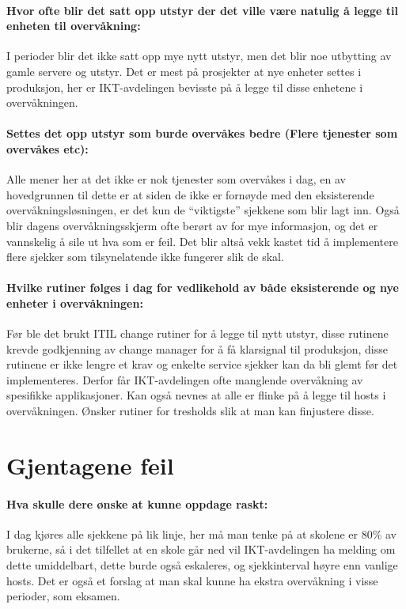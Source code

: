 \paragraph{Hvor ofte blir det satt opp utstyr der det ville være natulig å legge til enheten til overvåkning:}
I perioder blir det ikke satt opp mye nytt utstyr, men det blir noe utbytting av gamle servere og utstyr. Det er mest på prosjekter at nye enheter settes i produksjon, her er IKT-avdelingen bevisste på å legge til disse enhetene i overvåkningen.
\paragraph{Settes det opp utstyr som burde overvåkes bedre (Flere tjenester som overvåkes etc):}
Alle mener her at det ikke er nok tjenester som overvåkes i dag, en av hovedgrunnen til dette er at siden de ikke er fornøyde med den eksisterende overvåkningsløsningen, er det kun de “viktigste” sjekkene som blir lagt inn. Også blir dagens overvåkningsskjerm ofte berørt av for mye informasjon, og det er vannskelig å sile ut hva som er feil. Det blir altså vekk kastet tid å implementere flere sjekker som tilsynelatende ikke fungerer slik de skal.
\paragraph{Hvilke rutiner følges i dag for vedlikehold av både eksisterende og nye enheter i overvåkningen:}
Før ble det brukt ITIL change rutiner for å legge til nytt utstyr, disse rutinene krevde godkjenning av change manager for å få klarsignal til produksjon, disse rutinene er ikke lengre et krav og enkelte service sjekker kan da bli glemt før det implementeres. Derfor får IKT-avdelingen ofte manglende overvåkning av spesifikke applikasjoner. Kan også nevnes at alle er flinke på å legge til hosts i overvåkningen. Ønsker rutiner for tresholds slik at man kan finjustere disse.
\section{Gjentagene feil}
\paragraph{Hva skulle dere ønske at kunne oppdage raskt:}
I dag kjøres alle sjekkene på lik linje, her må man tenke på at skolene er 80\% av brukerne, så i det tilfellet at en skole går ned vil IKT-avdelingen ha melding om dette umiddelbart, dette burde også eskaleres, og sjekkinterval høyre enn vanlige hosts. Det er også et forslag at man skal kunne ha ekstra overvåkning i visse perioder, som eksamen.
